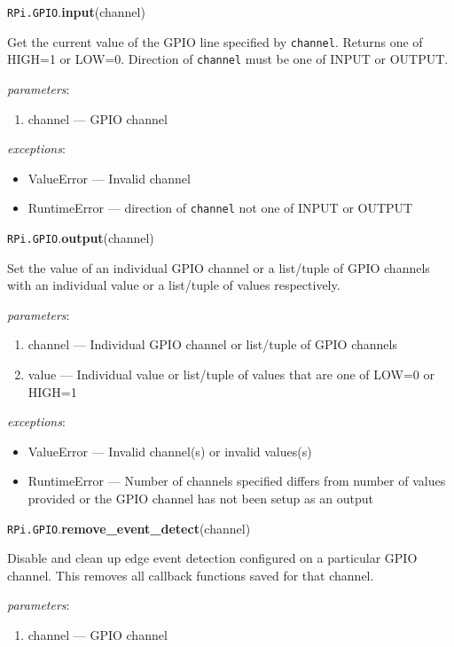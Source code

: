 \documentclass[12pt]{article}
\begin{document}
\noindent \texttt{RPi.GPIO}.\textbf{input}(channel)
        
Get the current value of the GPIO line specified by \texttt{channel}. Returns one of HIGH=1 or LOW=0. Direction of \texttt{channel} must be one of INPUT or OUTPUT.
        
\textit{parameters}:
\begin{enumerate}      
        \item channel --- GPIO channel
\end{enumerate}
 
 
\textit{exceptions}:
\begin{itemize}
    \item ValueError --- Invalid channel
    \item RuntimeError --- direction of \texttt{channel} not one of INPUT or OUTPUT
\end{itemize}


\noindent \texttt{RPi.GPIO}.\textbf{output}(channel)
        
Set the value of an individual GPIO channel or a list/tuple of GPIO channels with an individual value or a list/tuple of values respectively.
        
\textit{parameters}:
\begin{enumerate}      
        \item channel --- Individual GPIO channel or list/tuple of GPIO channels
        \item value --- Individual value or list/tuple of values that are one of LOW=0 or HIGH=1
\end{enumerate}
 
 
\textit{exceptions}:
\begin{itemize}
    \item ValueError --- Invalid channel(s) or invalid values(s)
    \item RuntimeError --- Number of channels specified differs from number of values provided or the GPIO channel has not been setup as an output
\end{itemize}



\noindent \texttt{RPi.GPIO}.\textbf{remove\_event\_detect}(channel)
        
Disable and clean up edge event detection configured on a particular GPIO channel. This removes all callback functions saved for that channel.
        
\textit{parameters}:
\begin{enumerate}      
        \item channel --- GPIO channel
\end{enumerate}
\end{document}
